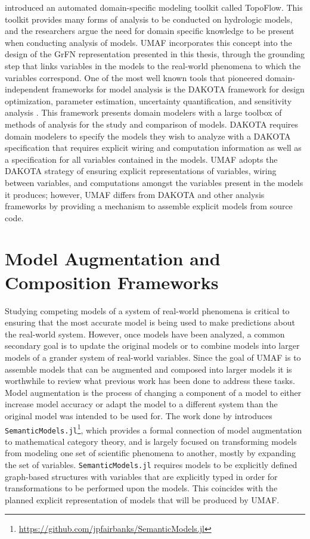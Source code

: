 \citet{peckham2017reproducible} introduced an automated domain-specific modeling toolkit called TopoFlow.
This toolkit provides many forms of analysis to be conducted on hydrologic models, and the researchers argue the need for domain specific knowledge to be present when conducting analysis of models.
UMAF incorporates this concept into the design of the GrFN representation presented in this thesis, through the grounding step that links variables in the models to the real-world phenomena to which the variables correspond.
One of the most well known tools that pioneered domain-independent frameworks for model analysis is the DAKOTA framework for design optimization, parameter estimation, uncertainty quantification, and sensitivity analysis \citep{adams2009dakota}.
This framework presents domain modelers with a large toolbox of methods of analysis for the study and comparison of models.
DAKOTA requires domain modelers to specify the models they wish to analyze with a DAKOTA specification that requires explicit wiring and computation information as well as a specification for all variables contained in the models.
UMAF adopts the DAKOTA strategy of ensuring explicit representations of variables, wiring between variables, and computations amongst the variables present in the models it produces; however, UMAF differs from DAKOTA and other analysis frameworks by providing a mechanism to assemble explicit models from source code.

\section{Model Augmentation and Composition Frameworks \label{sec:rwork_composition}}
Studying competing models of a system of real-world phenomena is critical to ensuring that the most accurate model is being used to make predictions about the real-world system.
However, once models have been analyzed, a common secondary goal is to update the original models or to combine models into larger models of a grander system of real-world variables.
Since the goal of UMAF is to assemble models that can be augmented and composed into larger models it is worthwhile to review what previous work has been done to address these tasks.
Model augmentation is the process of changing a component of a model to either increase model accuracy or adapt the model to a different system than the original model was intended to be used for.
The work done by \citet{semanticModels2019} introduces \texttt{SemanticModels.jl}\footnote{\url{https://github.com/jpfairbanks/SemanticModels.jl}}, which provides a formal connection of model augmentation to mathematical category theory, and is largely focused on transforming models from modeling one set of scientific phenomena to another, mostly by expanding the set of variables.
\texttt{SemanticModels.jl} requires models to be explicitly defined graph-based structures with variables that are explicitly typed in order for transformations to be performed upon the models.
This coincides with the planned explicit representation of models that will be produced by UMAF.

